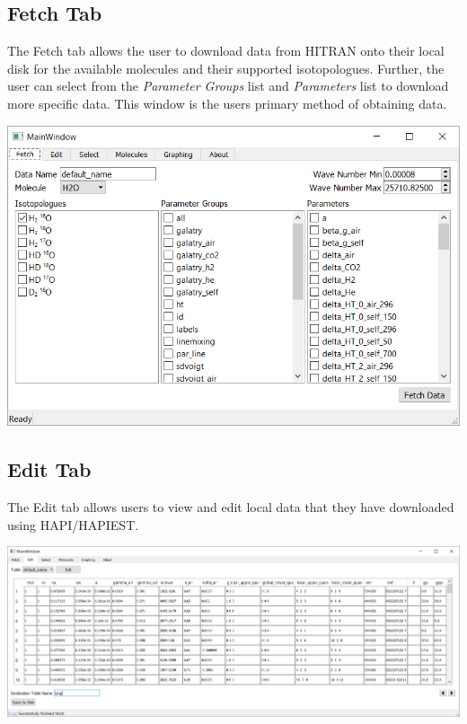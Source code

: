 \documentclass[a0,landscape]{a0poster}
\begin{document}
\begin{multicols}{3}
\subsection*{Fetch Tab}
The Fetch tab allows the user to download data from HITRAN onto their local disk for the available molecules and their supported isotopologues. Further, the user can select from the \textit{Parameter Groups} list and \textit{Parameters} list to download more specific data. This window is the users primary method of obtaining data.
\begin{center}
\includegraphics[scale = 1.5]{MainWindow_Fetch.png}
\end{center}
\subsection*{Edit Tab}
The Edit tab allows users to view and edit local data that they have downloaded using HAPI/HAPIEST.
\begin{center}
\includegraphics[scale = 1]{MainWindow_Edit.png}
\end{center}
\vfill\null
\columnbreak

\end{multicols}
\end{document}
